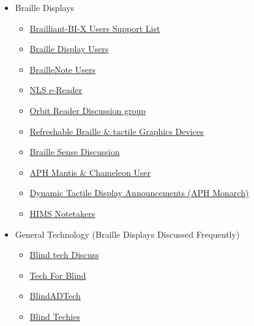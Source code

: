 \begin{itemize}[leftmargin=*]
	\item Braille Displays
	      \begin{itemize}[leftmargin=2em]
	      	\item \href{http://groups.io/g/Brailliant-BI-X-USERS/}{Brailliant-BI-X Users Support List}
	      	\item \href{http://groups.io/g/braille-display-users}{Braille Display Users}  
	      	\item \href{http://groups.io/g/braillenote}{BrailleNote Users}  
	      	\item \href{http://groups.io/g/nlsEReader/messages}{NLS e-Reader}  
	      	\item \href{http://groups.io/g/orbit-reader}{Orbit Reader Discussion group}  
	      	\item \href{http://www.freelists.org/list/braillecell}{Refreshable Braille \& tactile Graphics Devices}  
	      	\item \href{http://www.freelists.org/list/braille-sense}{Braille Sense Discussion}  
	      	\item \href{http://www.freelists.org/list/aphmantischameleonuser}{APH Mantis \& Chameleon User}  
	      	\item \href{http://www.freelists.org/list/aph\_dynamictactiledisplay\_announce}{Dynamic Tactile Display Announcements (APH Monarch)}  
	      	\item \href{http://groups.io/g/hims-notetakers-chat}{HIMS Notetakers}  
	      \end{itemize}
	\item General Technology (Braille Displays Discussed Frequently)
	      \begin{itemize}[leftmargin=2em]
	      	\item \href{http://groups.io/g/blindtechdiscuss/messages}{Blind tech Discuss}  
	      	\item \href{http://groups.io/g/tech-for-blind}{Tech For Blind}  
	      	\item \href{http://groups.io/g/blindadtech}{BlindADTech}  
	      	\item \href{http://groups.io/g/blind-techies/messages}{Blind Techies}  
	      \end{itemize}
\end{itemize}
